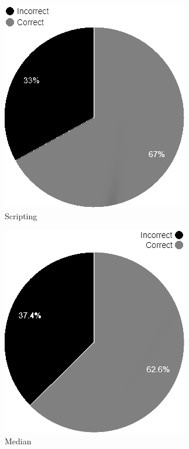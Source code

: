 \begin{minipage}{0.5\textwidth}
\begin{figure}[H]
    \caption{Scripting}
    \includegraphics[scale=0.65]{./Images/VSCA scripting.png}
\end{figure}
\end{minipage}
\hspace{0.8cm}
\begin{minipage}{0.45\textwidth}\raggedleft
\begin{figure}[H]
    \caption{Median}
    \includegraphics[scale=0.65]{./Images/VSCA avg.png}
\end{figure}

\end{minipage}



